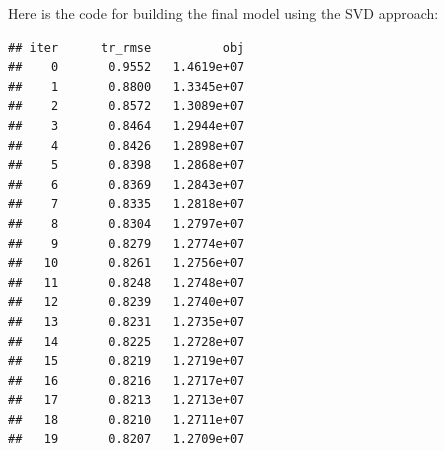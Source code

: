 \documentclass[
]{article}
\newenvironment{Shaded}{}{}
\newcommand{\AttributeTok}[1]{\textcolor[rgb]{0.49,0.56,0.16}{#1}}
\newcommand{\CommentTok}[1]{\textcolor[rgb]{0.38,0.63,0.69}{\textit{#1}}}
\newcommand{\ConstantTok}[1]{\textcolor[rgb]{0.53,0.00,0.00}{#1}}
\newcommand{\FunctionTok}[1]{\textcolor[rgb]{0.02,0.16,0.49}{#1}}
\newcommand{\NormalTok}[1]{#1}
\newcommand{\OtherTok}[1]{\textcolor[rgb]{0.00,0.44,0.13}{#1}}
\newcommand{\SpecialCharTok}[1]{\textcolor[rgb]{0.25,0.44,0.63}{#1}}
\newcommand{\StringTok}[1]{\textcolor[rgb]{0.25,0.44,0.63}{#1}}
\begin{document}
Here is the code for building the final model using the SVD approach:

\begin{Shaded}
\end{Shaded}

\begin{verbatim}
## iter      tr_rmse          obj
##    0       0.9552   1.4619e+07
##    1       0.8800   1.3345e+07
##    2       0.8572   1.3089e+07
##    3       0.8464   1.2944e+07
##    4       0.8426   1.2898e+07
##    5       0.8398   1.2868e+07
##    6       0.8369   1.2843e+07
##    7       0.8335   1.2818e+07
##    8       0.8304   1.2797e+07
##    9       0.8279   1.2774e+07
##   10       0.8261   1.2756e+07
##   11       0.8248   1.2748e+07
##   12       0.8239   1.2740e+07
##   13       0.8231   1.2735e+07
##   14       0.8225   1.2728e+07
##   15       0.8219   1.2719e+07
##   16       0.8216   1.2717e+07
##   17       0.8213   1.2713e+07
##   18       0.8210   1.2711e+07
##   19       0.8207   1.2709e+07
\end{verbatim}
\end{document}
